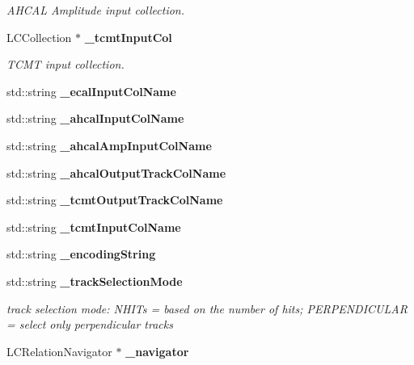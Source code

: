 \begin{DoxyCompactItemize}
\begin{DoxyCompactList}\small\item\em AHCAL Amplitude input collection. \item\end{DoxyCompactList}\item 
LCCollection $\ast$ {\bf \_\-tcmtInputCol}\label{classCALICE_1_1AngleTrackFinder_a961a3ce5cad59157ae7cc350da27017b}

\begin{DoxyCompactList}\small\item\em TCMT input collection. \item\end{DoxyCompactList}\item 
std::string {\bfseries \_\-ecalInputColName}\label{classCALICE_1_1AngleTrackFinder_aa226f88b009a6d2f77c4b8c863579ac1}

\item 
std::string {\bfseries \_\-ahcalInputColName}\label{classCALICE_1_1AngleTrackFinder_af139ab1be231e5e7daa0d72c3b05ce27}

\item 
std::string {\bfseries \_\-ahcalAmpInputColName}\label{classCALICE_1_1AngleTrackFinder_a00c257e37403fb1209fcded626033de5}

\item 
std::string {\bfseries \_\-ahcalOutputTrackColName}\label{classCALICE_1_1AngleTrackFinder_afcc15eae818bff82cb07f8a206b4eb6b}

\item 
std::string {\bfseries \_\-tcmtOutputTrackColName}\label{classCALICE_1_1AngleTrackFinder_afc39c68fdbd2e58a0ae729952f6c307e}

\item 
std::string {\bfseries \_\-tcmtInputColName}\label{classCALICE_1_1AngleTrackFinder_af55dd53460826abc6abe7eb4917f201b}

\item 
std::string {\bfseries \_\-encodingString}\label{classCALICE_1_1AngleTrackFinder_aec98c28c81cf10cb1fd7d83bbe560120}

\item 
std::string {\bf \_\-trackSelectionMode}\label{classCALICE_1_1AngleTrackFinder_a9e65faf8074db90de8771bc2dccf072c}

\begin{DoxyCompactList}\small\item\em track selection mode: NHITs = based on the number of hits; PERPENDICULAR = select only perpendicular tracks \item\end{DoxyCompactList}\item 
LCRelationNavigator $\ast$ {\bfseries \_\-navigator}\label{classCALICE_1_1AngleTrackFinder_adb33fe8149d97611b8eb62037138f972}


\end{DoxyCompactItemize}
